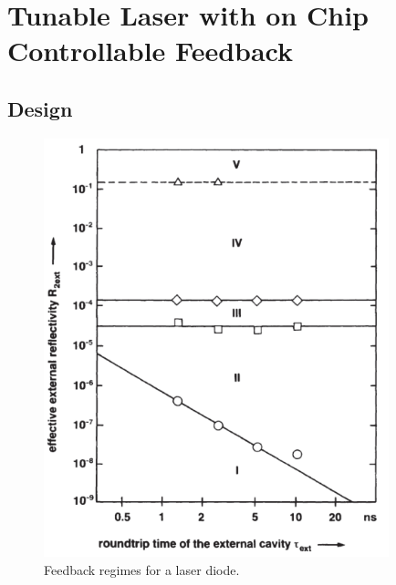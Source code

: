 \chapter{Tunable Laser with on Chip Controllable Feedback}\label{ch:laser_with_on_chip_feedback}
\section{Design}\label{sec:design}
\begin{figure}[ht]
    \centering
    \includegraphics[width=10cm]{figures/feedback_region.PNG}
    \caption{Feedback regimes for a laser diode.}
    \label{feedback_region}
\end{figure}
